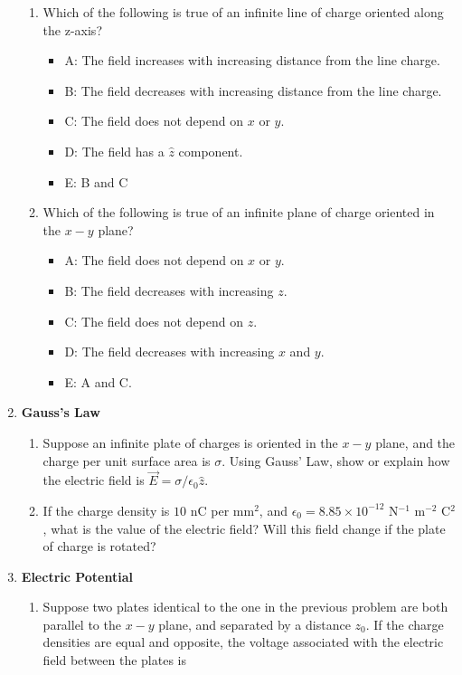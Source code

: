 \documentclass[10pt]{article}
\begin{document}
\begin{enumerate}
\begin{enumerate}
\item Which of the following is true of an infinite line of charge oriented along the z-axis?
\begin{itemize}
\item A: The field increases with increasing distance from the line charge.
\item B: The field decreases with increasing distance from the line charge.
\item C: The field does not depend on $x$ or $y$.
\item D: The field has a $\hat{z}$ component.
\item E: B and C
\end{itemize}
\item Which of the following is true of an infinite plane of charge oriented in the $x-y$ plane?
\begin{itemize}
\item A: The field does not depend on $x$ or $y$.
\item B: The field decreases with increasing $z$.
\item C: The field does not depend on $z$.
\item D: The field decreases with increasing $x$ and $y$.
\item E: A and C.
\end{itemize}
\end{enumerate}
\item \textbf{Gauss's Law}
\begin{enumerate}
\item Suppose an infinite plate of charges is oriented in the $x-y$ plane, and the charge per unit surface area is $\sigma$.  Using Gauss' Law, show or explain how the electric field is $\vec{E} = \sigma/\epsilon_0 \hat{z}$. \\ \vspace{3cm}
\item If the charge density is $10$ nC per mm$^2$, and $\epsilon_0 = 8.85 \times 10^{-12}$ N$^{-1}$ m$^{-2}$ C$^2$, what is the value of the electric field?  Will this field change if the plate of charge is rotated?  \\ \vspace{2cm}
\end{enumerate}
\item \textbf{Electric Potential}
\begin{enumerate}
\item Suppose two plates identical to the one in the previous problem are both parallel to the $x-y$ plane, and separated by a distance $z_0$.  If the charge densities are equal and opposite, the voltage associated with the electric field between the plates is

\end{enumerate}
\end{enumerate}
\end{document}
